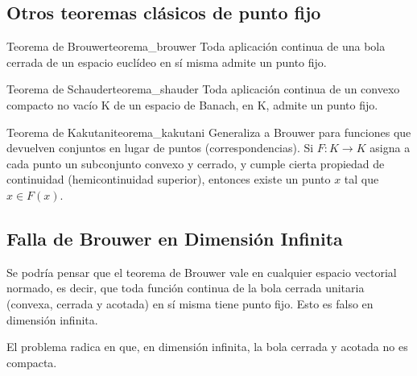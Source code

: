\documentclass[11pt, a4paper]{article}
\begin{document}
\subsection{Otros teoremas clásicos de punto fijo}

\begin{teorema}{Teorema de Brouwer}{teorema_brouwer}
Toda aplicación continua de una bola cerrada de un espacio euclídeo en sí misma admite un punto
fijo.
\end{teorema}

\begin{teorema}{Teorema de Schauder}{teorema_shauder}
Toda aplicación continua de un convexo compacto no vacío K de un espacio de Banach, en K, admite un
punto fijo.
\end{teorema}

\begin{teorema}{Teorema de Kakutani}{teorema_kakutani}
Generaliza a Brouwer para funciones que devuelven conjuntos en lugar de puntos (correspondencias).
Si $F: K \to K$ asigna a cada punto un subconjunto convexo y cerrado, y cumple cierta propiedad de
continuidad (hemicontinuidad superior), entonces existe un punto $x$ tal que $x \in F(x)$.
\end{teorema}

\subsection{Falla de Brouwer en Dimensión Infinita}

Se podría pensar que el teorema de Brouwer vale en cualquier espacio vectorial normado, es decir,
que toda función continua de la bola cerrada unitaria (convexa, cerrada y acotada) en sí misma tiene
punto fijo. Esto es falso en dimensión infinita.

El problema radica en que, en dimensión infinita, la bola cerrada y acotada no es compacta.
\end{document}
